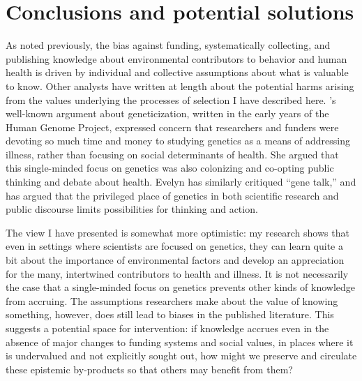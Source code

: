 \documentclass[twocolumn, serif, meta, authordate]{jote-article}
\begin{document}
 {} \section*{Conclusions and potential solutions}

As noted previously, the bias against funding, systematically collecting, and publishing knowledge about environmental contributors to behavior and human health is driven by individual and collective assumptions about what is valuable to know. Other analysts have written at length about the potential harms arising from the values underlying the processes of selection I have described here. \textcite{Lippman1992}'s well-known argument about geneticization, written in the early years of the Human Genome Project, expressed concern that researchers and funders were devoting so much time and money to studying genetics as a means of addressing illness, rather than focusing on social determinants of health. She argued that this single-minded focus on genetics was also colonizing and co-opting public thinking and debate about health. Evelyn \textcite{Keller2000} has similarly critiqued ``gene talk,'' and has argued that the privileged place of genetics in both scientific research and public discourse limits possibilities for thinking and action.

The view I have presented is somewhat more optimistic: my research shows that even in settings where scientists are focused on genetics, they can learn quite a bit about the importance of environmental factors and develop an appreciation for the many, intertwined contributors to health and illness. It is not necessarily the case that a single-minded focus on genetics prevents other kinds of knowledge from accruing. The assumptions researchers make about the value of knowing something, however, does still lead to biases in the published literature. This suggests a potential space for intervention: if knowledge accrues even in the absence of major changes to funding systems and social values, in places where it is undervalued and not explicitly sought out, how might we preserve and circulate these epistemic by-products so that others may benefit from them?
\end{document}
